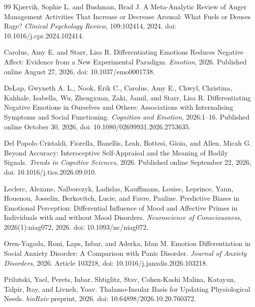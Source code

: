 \documentclass[11pt]{article}
\begin{document}
\begin{thebibliography}{99}
Kj{\ae}rvik, Sophie L. and Bushman, Brad J.
\newblock A Meta-Analytic Review of Anger Management Activities That Increase or Decrease Arousal: What Fuels or Douses Rage?
\newblock \emph{Clinical Psychology Review}, 109:102414, 2024.
\newblock doi: 10.1016/j.cpr.2024.102414.

Carolus, Amy E. and Starr, Lisa R.
\newblock Differentiating Emotions Reduces Negative Affect: Evidence from a New Experimental Paradigm.
\newblock \emph{Emotion}, 2026.
\newblock Published online August 27, 2026, doi: 10.1037/emo0001738.

DeLap, Gwyneth A. L., Nook, Erik C., Carolus, Amy E., Chwyl, Christina, Kahhale, Isabella, Wu, Zhengxuan, Zaki, Jamil, and Starr, Lisa R.
\newblock Differentiating Negative Emotions in Ourselves and Others: Associations with Internalising Symptoms and Social Functioning.
\newblock \emph{Cognition and Emotion}, 2026:1--16.
\newblock Published online October 30, 2026, doi: 10.1080/02699931.2026.2753635.

Del Popolo Cristaldi, Fiorella, Banellis, Leah, Bottesi, Gioia, and Allen, Micah G.
\newblock Beyond Accuracy: Interoceptive Self-Appraisal and the Meaning of Bodily Signals.
\newblock \emph{Trends in Cognitive Sciences}, 2026.
\newblock Published online September 22, 2026, doi: 10.1016/j.tics.2026.09.010.

Leclerc, Alexane, Nalborczyk, Ladislas, Kauffmann, Louise, Leprince, Yann, Houenou, Josselin, Berkovitch, Lucie, and Favre, Pauline.
\newblock Predictive Biases in Emotional Perception: Differential Influence of Mood and Affective Primes in Individuals with and without Mood Disorders.
\newblock \emph{Neuroscience of Consciousness}, 2026(1):niag072, 2026.
\newblock doi: 10.1093/nc/niag072.

Oren-Yagoda, Roni, Laps, Inbar, and Aderka, Idan M.
\newblock Emotion Differentiation in Social Anxiety Disorder: A Comparison with Panic Disorder.
\newblock \emph{Journal of Anxiety Disorders}, 2026.
\newblock Article 103218, doi: 10.1016/j.janxdis.2026.103218.

Prilutski, Yael, Perets, Inbar, Shtiglitz, Stav, Cohen-Kashi Malina, Katayun, Talpir, Itay, and Livneh, Yoav.
\newblock Thalamo-Insular Basis for Updating Physiological Needs.
\newblock \emph{bioRxiv} preprint, 2026.
\newblock doi: 10.64898/2026.10.20.760372.


\end{thebibliography}
\end{document}
